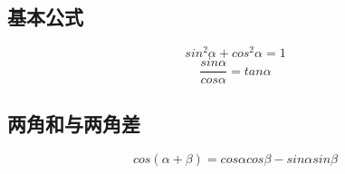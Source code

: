 
\begin{issues}
\issueDraft
\end{issues}

\subsection{基本公式}
\begin{equation}
sin^2\alpha + cos^2\alpha = 1
\end{equation}
\begin{equation}
\frac{sin\alpha}{cos\alpha} = tan\alpha
\end{equation}

\subsection{两角和与两角差}

\begin{equation}
cos(\alpha + \beta) = cos\alpha cos\beta - sin\alpha sin\beta
\end{equation}